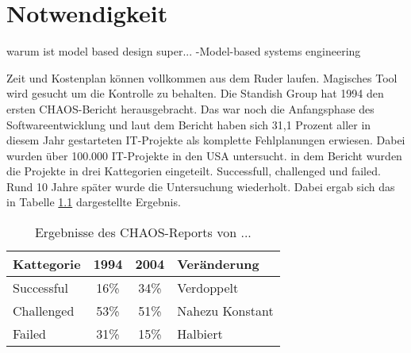 \chapter{Notwendigkeit}
\label{cha:notwendigkeit}
warum ist model based design super...
-Model-based systems engineering


Zeit und Kostenplan können vollkommen aus dem Ruder laufen.
Magisches Tool wird  gesucht um die Kontrolle zu behalten.
Die Standish Group hat 1994 den ersten CHAOS-Bericht herausgebracht.
Das war noch die Anfangsphase des Softwareentwicklung und laut dem Bericht haben sich  31,1 Prozent aller in diesem Jahr gestarteten IT-Projekte als komplette Fehlplanungen erwiesen.
Dabei wurden über 100.000 IT-Projekte in den USA untersucht.
in dem Bericht wurden die Projekte in drei Kattegorien eingeteilt. Successfull, challenged und failed. 
Rund 10 Jahre später wurde die Untersuchung wiederholt. Dabei ergab sich das in Tabelle \ref{Ergebnisse des CHAOS-Reports} dargestellte Ergebnis.

\begin{table}
	\caption{Ergebnisse des CHAOS-Reports von ...}
	\begin{center}
	\begin{tabular}{|l|c|c|l|} \hline
		Kattegorie & 1994 & 2004 & Veränderung \\ \hline
		Successful & 16\% & 34\% & Verdoppelt \\ \hline
		Challenged & 53\% & 51\% & Nahezu Konstant \\ \hline
		Failed 	   & 31\% & 15\% & Halbiert \\ \hline					
	\end{tabular}
	\end{center}
	\label{Ergebnisse des CHAOS-Reports}
\end{table} 

